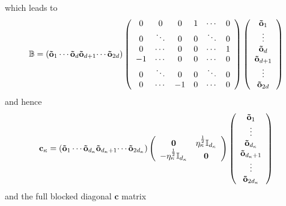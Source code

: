 \documentclass[aps,preprint]{revtex4}%
\begin{document}
which leads to
\begin{equation}
\mathbb{B}=\left(  \mathbf{\tilde{o}}_{1}\cdots\mathbf{\tilde{o}}%
_{d}\mathbf{\tilde{o}}_{d+1}\mathbf{\cdots\tilde{o}}_{2d}\right)  \left(
\begin{array}
[c]{cccccc}%
0 & 0 & 0 & 1 & \cdots & 0\\
0 & \ddots & 0 & 0 & \ddots & 0\\
0 & \cdots & 0 & 0 & \cdots & 1\\
-1 & \cdots & 0 & 0 & \cdots & 0\\
0 & \ddots & 0 & 0 & \ddots & 0\\
0 & \cdots & -1 & 0 & \cdots & 0
\end{array}
\right)  \left(
\begin{array}
[c]{c}%
\mathbf{\tilde{o}}_{1}\\
\vdots\\
\mathbf{\tilde{o}}_{d}\\
\mathbf{\tilde{o}}_{d+1}\\
\vdots\\
\mathbf{\tilde{o}}_{2d}%
\end{array}
\right)
\end{equation}
and hence%
\begin{equation}
\mathbf{c}_{\kappa}=\left(  \mathbf{\tilde{o}}_{1}\cdots\mathbf{\tilde{o}%
}_{d_{\kappa}}\mathbf{\tilde{o}}_{d_{\kappa}+1}\mathbf{\cdots\tilde{o}%
}_{2d_{\kappa}}\right)  \left(
\begin{array}
[c]{cc}%
\mathbf{0} & \eta_{\kappa}^{\frac{1}{2}}\mathbb{I}_{d_{\kappa}}\\
-\eta_{\kappa}^{\frac{1}{2}}\mathbb{I}_{d_{\kappa}} & \mathbf{0}%
\end{array}
\right)  \left(
\begin{array}
[c]{c}%
\mathbf{\tilde{o}}_{1}\\
\vdots\\
\mathbf{\tilde{o}}_{d_{\kappa}}\\
\mathbf{\tilde{o}}_{d_{\kappa}+1}\\
\vdots\\
\mathbf{\tilde{o}}_{2d_{\kappa}}%
\end{array}
\right)
\end{equation}
and the full blocked diagonal $\mathbf{c}$ matrix
\end{document}
